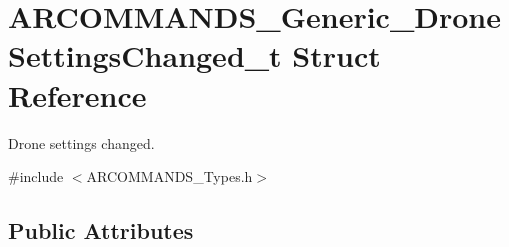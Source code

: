 \hypertarget{struct_a_r_c_o_m_m_a_n_d_s___generic___drone_settings_changed__t}{}\section{A\+R\+C\+O\+M\+M\+A\+N\+D\+S\+\_\+\+Generic\+\_\+\+Drone\+Settings\+Changed\+\_\+t Struct Reference}
\label{struct_a_r_c_o_m_m_a_n_d_s___generic___drone_settings_changed__t}


Drone settings changed.  




{\ttfamily \#include $<$A\+R\+C\+O\+M\+M\+A\+N\+D\+S\+\_\+\+Types.\+h$>$}

\subsection*{Public Attributes}
